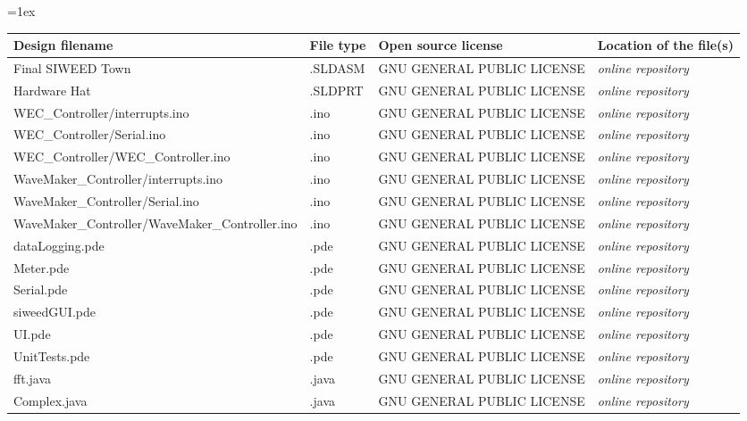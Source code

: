 \documentclass[11pt, letterpaper]{article}
\begin{document}
\tabulinesep=1ex
\begin{tabu} to \linewidth {|X|X|X[1.5,1]|X[1.5,1]|}
\hline
\textbf{Design filename} & \textbf{File type} & \textbf{Open source license} & \textbf{Location of the file(s)} \\\hline
Final SIWEED Town & .SLDASM & GNU GENERAL PUBLIC LICENSE & \textit{online repository} \\\hline
Hardware Hat & .SLDPRT & GNU GENERAL PUBLIC LICENSE & \textit{online repository} \\\hline
WEC\_Controller\slash interrupts.ino & .ino & GNU GENERAL PUBLIC LICENSE& \textit{online repository} \\\hline
WEC\_Controller\slash Serial.ino & .ino & GNU GENERAL PUBLIC LICENSE& \textit{online repository} \\\hline
WEC\_Controller\slash WEC\_Controller.ino & .ino & GNU GENERAL PUBLIC LICENSE& \textit{online repository} \\\hline
WaveMaker\_Controller\slash interrupts.ino & .ino & GNU GENERAL PUBLIC LICENSE& \textit{online repository} \\\hline
WaveMaker\_Controller\slash Serial.ino & .ino & GNU GENERAL PUBLIC LICENSE& \textit{online repository} \\\hline
WaveMaker\_Controller\slash WaveMaker\_Controller.ino & .ino & GNU GENERAL PUBLIC LICENSE& \textit{online repository} \\\hline
dataLogging.pde & .pde& GNU GENERAL PUBLIC LICENSE & \textit{online repository} \\\hline
Meter.pde & .pde& GNU GENERAL PUBLIC LICENSE & \textit{online repository} \\\hline
Serial.pde & .pde& GNU GENERAL PUBLIC LICENSE & \textit{online repository} \\\hline
siweedGUI.pde & .pde& GNU GENERAL PUBLIC LICENSE & \textit{online repository} \\\hline
UI.pde & .pde& GNU GENERAL PUBLIC LICENSE & \textit{online repository} \\\hline
UnitTests.pde & .pde& GNU GENERAL PUBLIC LICENSE & \textit{online repository} \\\hline
fft.java & .java& GNU GENERAL PUBLIC LICENSE & \textit{online repository} \\\hline
Complex.java & .java& GNU GENERAL PUBLIC LICENSE & \textit{online repository} \\\hline
\end{tabu}
\end{document}
